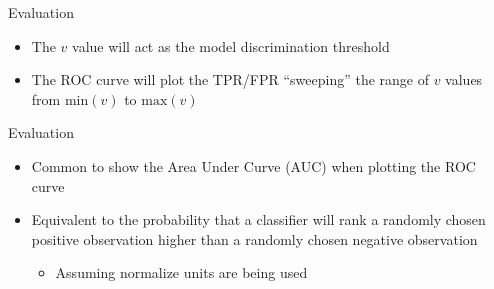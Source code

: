 \begin{frame}{Evaluation}
    \begin{itemize}
        \item The $v$ value will act as the model discrimination threshold
        \item The ROC curve will plot the TPR/FPR ``sweeping'' the range of $v$ values from $\text{min}(v)$ to $\text{max}(v)$
    \end{itemize}
\end{frame}

\begin{frame}{Evaluation}
    \begin{itemize}
        \item Common to show the Area Under Curve (AUC) when plotting the ROC curve
        \item Equivalent to the probability that a classifier will rank a randomly chosen positive observation higher than a randomly chosen negative observation \cite{article:roc-analysis}
            \begin{itemize}
                \item Assuming normalize units are being used
            \end{itemize}
    \end{itemize}
\end{frame}